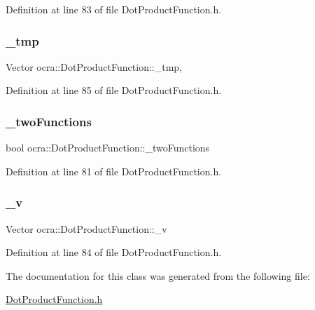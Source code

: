 Definition at line 83 of file Dot\+Product\+Function.\+h.

\hypertarget{classocra_1_1DotProductFunction_a82d2cb16e4b9b6d50e59fabfb25fc222}{}\label{classocra_1_1DotProductFunction_a82d2cb16e4b9b6d50e59fabfb25fc222} 
\subsubsection{\texorpdfstring{\+\_\+tmp}{\_tmp}}
{\footnotesize\ttfamily Vector ocra\+::\+Dot\+Product\+Function\+::\+\_\+tmp\hspace{0.3cm}{\ttfamily [mutable]}, {\ttfamily [protected]}}



Definition at line 85 of file Dot\+Product\+Function.\+h.

\hypertarget{classocra_1_1DotProductFunction_a8450996eff9607045cf57a4502ff0944}{}\label{classocra_1_1DotProductFunction_a8450996eff9607045cf57a4502ff0944} 
\subsubsection{\texorpdfstring{\+\_\+two\+Functions}{\_twoFunctions}}
{\footnotesize\ttfamily bool ocra\+::\+Dot\+Product\+Function\+::\+\_\+two\+Functions\hspace{0.3cm}{\ttfamily [protected]}}



Definition at line 81 of file Dot\+Product\+Function.\+h.

\hypertarget{classocra_1_1DotProductFunction_a6405d1f78159e5fc16801bd73eb32a68}{}\label{classocra_1_1DotProductFunction_a6405d1f78159e5fc16801bd73eb32a68} 
\subsubsection{\texorpdfstring{\+\_\+v}{\_v}}
{\footnotesize\ttfamily Vector ocra\+::\+Dot\+Product\+Function\+::\+\_\+v\hspace{0.3cm}{\ttfamily [protected]}}



Definition at line 84 of file Dot\+Product\+Function.\+h.



The documentation for this class was generated from the following file\+:\begin{DoxyCompactItemize}
\item 
\hyperlink{DotProductFunction_8h}{Dot\+Product\+Function.\+h}\end{DoxyCompactItemize}
